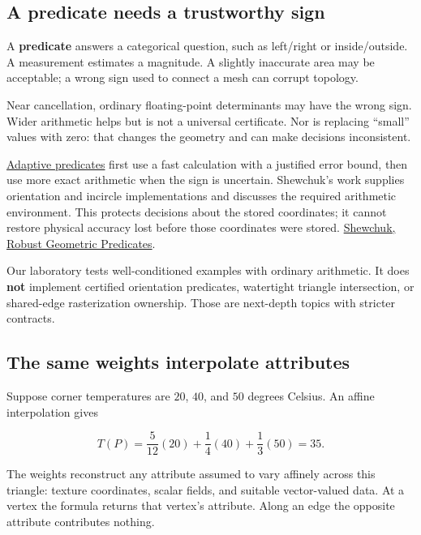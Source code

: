 \subsection{A predicate needs a trustworthy sign}\label{01-foundations-i-ch018-a-predicate-needs-a-trustworthy-sign}

A \textbf{predicate} answers a categorical question, such as left/right or inside/outside. A measurement estimates a magnitude. A slightly inaccurate area may be acceptable; a wrong sign used to connect a mesh can corrupt topology.

Near cancellation, ordinary floating-point determinants may have the wrong sign. Wider arithmetic helps but is not a universal certificate. Nor is replacing ``small'' values with zero: that changes the geometry and can make decisions inconsistent.

\hyperref[01-foundations-i-ch018-the-sensor-needs-coordinates-inside-the-triangle]{Adaptive predicates} first use a fast calculation with a justified error bound, then use more exact arithmetic when the sign is uncertain. Shewchuk's work supplies orientation and incircle implementations and discusses the required arithmetic environment. This protects decisions about the stored coordinates; it cannot restore physical accuracy lost before those coordinates were stored. \href{https://www.cs.cmu.edu/~quake/robust.html}{Shewchuk, Robust Geometric Predicates}.

Our laboratory tests well-conditioned examples with ordinary arithmetic. It does \textbf{not} implement certified orientation predicates, watertight triangle intersection, or shared-edge rasterization ownership. Those are next-depth topics with stricter contracts.

\subsection{The same weights interpolate attributes}\label{01-foundations-i-ch018-the-same-weights-interpolate-attributes}

Suppose corner temperatures are \(20\), \(40\), and \(50\) degrees Celsius. An affine interpolation gives

\[
T(P)=\frac5{12}(20)+\frac14(40)+\frac13(50)=35.
\]

The weights reconstruct any attribute assumed to vary affinely across this triangle: texture coordinates, scalar fields, and suitable vector-valued data. At a vertex the formula returns that vertex's attribute. Along an edge the opposite attribute contributes nothing.

